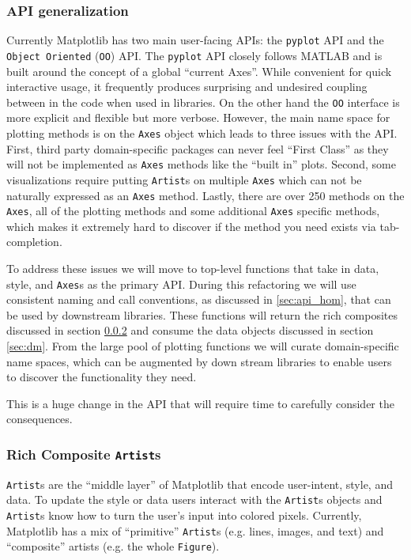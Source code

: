 \documentclass[11pt]{article}  %
\begin{document}
\subsubsection{API generalization}

Currently Matplotlib has two main user-facing APIs: the
\texttt{pyplot} API and the \texttt{Object Oriented} (\texttt{OO})
API.  The \texttt{pyplot} API closely follows MATLAB and is built
around the concept of a global ``current Axes''.  While convenient for
quick interactive usage, it frequently produces surprising and
undesired coupling between in the code when used in libraries.  On the
other hand the \texttt{OO} interface is more explicit and flexible but
more verbose.  However, the main name space for plotting methods is on
the \texttt{Axes} object which leads to three issues with the API.
First, third party domain-specific packages can never feel ``First
Class'' as they will not be implemented as \texttt{Axes} methods like
the ``built in'' plots.  Second, some visualizations require putting
\texttt{Artist}s on multiple \texttt{Axes} which can not be naturally
expressed as an \texttt{Axes} method.  Lastly, there are over 250
methods on the \texttt{Axes}, all of the plotting methods and some
additional \texttt{Axes} specific methods, which makes it extremely
hard to discover if the method you need exists via tab-completion.

To address these issues we will move to top-level functions that take
in data, style, and \texttt{Axes}s as the primary API.  During this
refactoring we will use consistent naming and call conventions, as
discussed in \ref{sec:api_hom}, that can be used by downstream
libraries.  These functions will return the rich composites discussed
in section \ref{sec:artists} and consume the data objects discussed in
section \ref{sec:dm}.  From the large pool of plotting functions we
will curate domain-specific name spaces, which can be augmented by
down stream libraries to enable users to discover the functionality
they need.

This is a huge change in the API that will require time to carefully
consider the consequences.



\subsubsection{Rich Composite \texttt{Artist}s}
\label{sec:artists}
\texttt{Artist}s are the ``middle layer'' of Matplotlib that encode
user-intent, style, and data.
To update the style or data users interact with the \texttt{Artist}s
objects and \texttt{Artist}s know how to turn the user's input into
colored pixels.
Currently, Matplotlib has a mix of ``primitive'' \texttt{Artist}s
(e.g. lines, images, and text) and ``composite'' artists (e.g.
the whole \texttt{Figure}).
\end{document}
